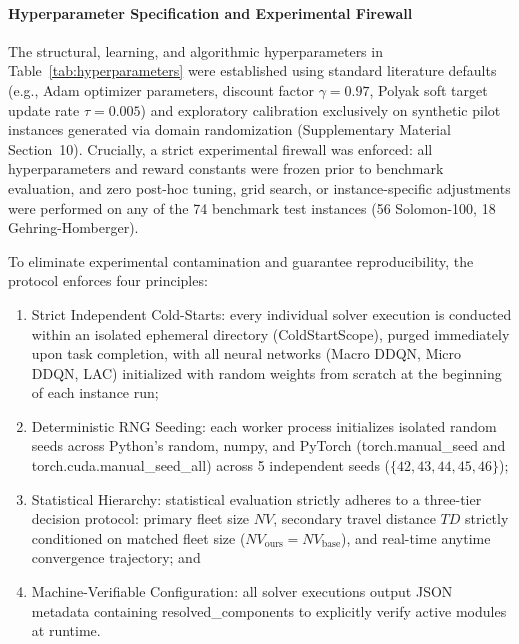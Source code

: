 \documentclass{ieeeaccess}
\begin{document}
\paragraph{Hyperparameter Specification and Experimental Firewall}
The structural, learning, and algorithmic hyperparameters in Table~\ref{tab:hyperparameters} were established using standard literature defaults (e.g., Adam optimizer parameters, discount factor $\gamma=0.97$, Polyak soft target update rate $\tau=0.005$) and exploratory calibration exclusively on synthetic pilot instances generated via domain randomization (Supplementary Material Section~10). Crucially, a strict experimental firewall was enforced: all hyperparameters and reward constants were frozen prior to benchmark evaluation, and zero post-hoc tuning, grid search, or instance-specific adjustments were performed on any of the 74 benchmark test instances (56 Solomon-100, 18 Gehring-Homberger).

To eliminate experimental contamination and guarantee reproducibility, the protocol enforces four principles:
\begin{enumerate}
    \item Strict Independent Cold-Starts: every individual solver execution is conducted within an isolated ephemeral directory (\textsf{\small ColdStartScope}), purged immediately upon task completion, with all neural networks (Macro DDQN, Micro DDQN, LAC) initialized with random weights from scratch at the beginning of each instance run;
    \item Deterministic RNG Seeding: each worker process initializes isolated random seeds across Python's \textsf{\small random}, \textsf{\small numpy}, and PyTorch (\textsf{\small torch.manual\_seed} and \textsf{\small torch.cuda.manual\_seed\_all}) across 5 independent seeds ($\{42, 43, 44, 45, 46\}$); 
    \item Statistical Hierarchy: statistical evaluation strictly adheres to a three-tier decision protocol: primary fleet size $NV$, secondary travel distance $TD$ strictly conditioned on matched fleet size ($NV_{\text{ours}} = NV_{\text{base}}$), and real-time anytime convergence trajectory; and 
    \item Machine-Verifiable Configuration: all solver executions output JSON metadata containing \textsf{\small resolved\_components} to explicitly verify active modules at runtime.
\end{enumerate} 
\end{document}
